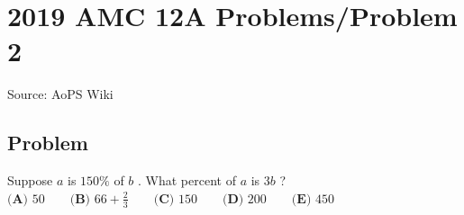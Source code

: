 \documentclass[12pt]{article}
\begin{document}
\section*{{2019 AMC 12A Problems/Problem 2}}
Source: AoPS Wiki

\subsection*{Problem}
Suppose $a$ is $150\%$ of $b$ . What percent of $a$ is $3b$ ? $\textbf{(A) } 50 \qquad \textbf{(B) } 66+\frac{2}{3} \qquad \textbf{(C) } 150 \qquad \textbf{(D) } 200 \qquad \textbf{(E) } 450$
\end{document}
